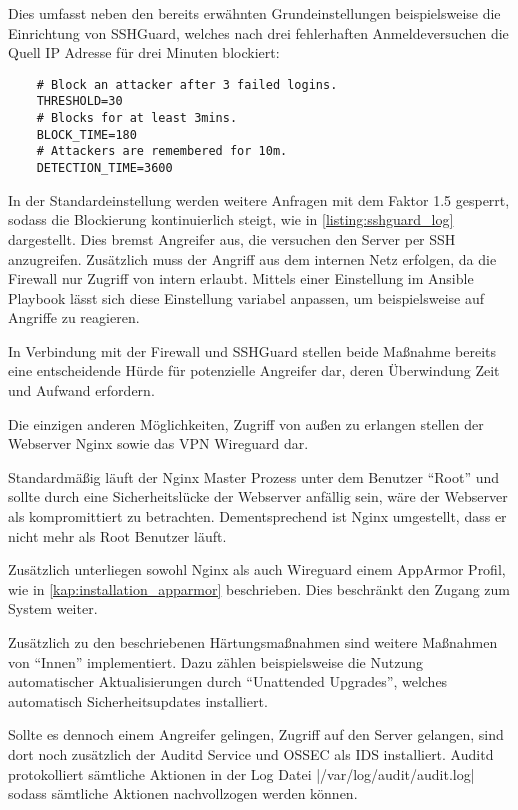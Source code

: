 Dies umfasst neben den bereits erwähnten Grundeinstellungen beispielsweise die Einrichtung von SSHGuard, welches nach drei fehlerhaften Anmeldeversuchen die Quell IP Adresse für drei Minuten blockiert:

\begin{verbatim}
	# Block an attacker after 3 failed logins.
	THRESHOLD=30
	# Blocks for at least 3mins.
	BLOCK_TIME=180
	# Attackers are remembered for 10m.
	DETECTION_TIME=3600
\end{verbatim}

In der Standardeinstellung werden weitere Anfragen mit dem Faktor 1.5 gesperrt, sodass die Blockierung kontinuierlich steigt, wie in \autoref{listing:sshguard_log} dargestellt. Dies bremst Angreifer aus, die versuchen den Server per SSH anzugreifen. Zusätzlich muss der Angriff aus dem internen Netz erfolgen, da die Firewall nur Zugriff von intern erlaubt. Mittels einer Einstellung im Ansible Playbook lässt sich diese Einstellung variabel anpassen, um beispielsweise auf Angriffe zu reagieren.

In Verbindung mit der Firewall und SSHGuard stellen beide Maßnahme bereits eine entscheidende Hürde für potenzielle Angreifer dar, deren Überwindung Zeit und Aufwand erfordern.

Die einzigen anderen Möglichkeiten, Zugriff von außen zu erlangen stellen der Webserver Nginx sowie das \ac{VPN} Wireguard dar.

Standardmäßig läuft der Nginx Master Prozess unter dem Benutzer \enquote{Root} und sollte durch eine Sicherheitslücke der Webserver anfällig sein, wäre der Webserver als kompromittiert zu betrachten. Dementsprechend ist Nginx umgestellt, dass er nicht mehr als Root Benutzer läuft.

Zusätzlich unterliegen sowohl Nginx als auch Wireguard einem AppArmor Profil, wie in \autoref{kap:installation_apparmor} beschrieben. Dies beschränkt den Zugang zum System weiter.

Zusätzlich zu den beschriebenen Härtungsmaßnahmen sind weitere Maßnahmen von \enquote{Innen} implementiert. Dazu zählen beispielsweise die Nutzung automatischer Aktualisierungen durch \enquote{Unattended Upgrades}, welches automatisch Sicherheitsupdates installiert.

Sollte es dennoch einem Angreifer gelingen, Zugriff auf den Server gelangen, sind dort noch zusätzlich der Auditd Service und OSSEC als \ac{IDS} installiert. Auditd protokolliert sämtliche Aktionen in der Log Datei |/var/log/audit/audit.log| sodass sämtliche Aktionen nachvollzogen werden können.

